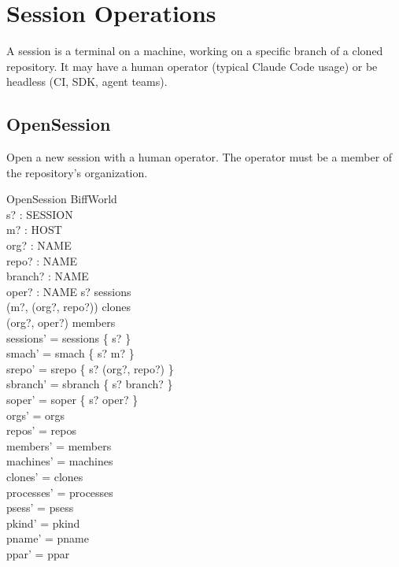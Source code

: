 \documentclass[a4paper,10pt,fleqn]{article}
\begin{document}
\section{Session Operations}

A session is a terminal on a machine, working on a specific branch of a
cloned repository.  It may have a human operator (typical Claude Code
usage) or be headless (CI, SDK, agent teams).

\subsection{OpenSession}

Open a new session with a human operator.  The operator must be a member
of the repository's organization.

\begin{schema}{OpenSession}
  \Delta BiffWorld \\
  s? : SESSION \\
  m? : HOST \\
  org? : NAME \\
  repo? : NAME \\
  branch? : NAME \\
  oper? : NAME
  \where
  s? \notin sessions \\
  (m?, (org?, repo?)) \in clones \\
  (org?, oper?) \in members \\
  sessions' = sessions \cup \{ s? \} \\
  smach' = smach \cup \{ s? \mapsto m? \} \\
  srepo' = srepo \cup \{ s? \mapsto (org?, repo?) \} \\
  sbranch' = sbranch \cup \{ s? \mapsto branch? \} \\
  soper' = soper \cup \{ s? \mapsto oper? \} \\
  orgs' = orgs \\
  repos' = repos \\
  members' = members \\
  machines' = machines \\
  clones' = clones \\
  processes' = processes \\
  psess' = psess \\
  pkind' = pkind \\
  pname' = pname \\
  ppar' = ppar
\end{schema}
\end{document}

